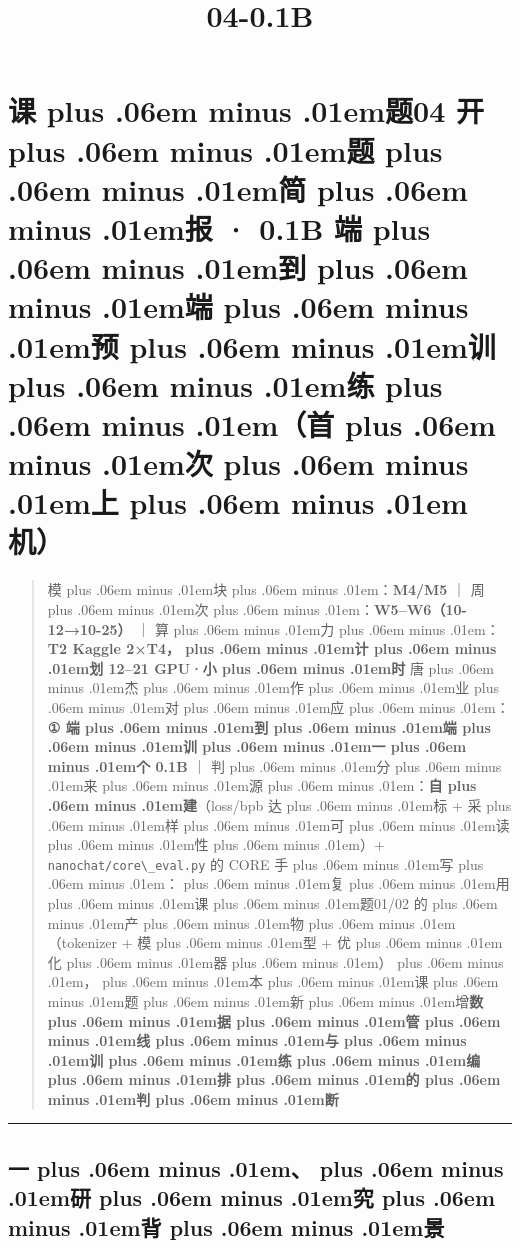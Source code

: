 \documentclass[
]{article}
\title{\zh{课\zhglue 题}04-0.1B\zh{端\zhglue 到\zhglue 端}}
\author{}
\date{}
\newcommand{\passthrough}[1]{#1}
\providecommand{\texorpdfstring}[2]{#1}   %
\def\zh#1{{\zhfont #1}}
\def\sym#1{{\symfont #1}}
\def\zhglue{\hskip0pt plus .06em minus .01em}
\begin{document}
\maketitle

{
\setcounter{tocdepth}{2}
\tableofcontents
}
\section{\texorpdfstring{\zh{课\zhglue 题}04 \zh{开\zhglue 题\zhglue 简\zhglue 报} \sym{·} 0.1B \zh{端\zhglue 到\zhglue 端\zhglue 预\zhglue 训\zhglue 练\zhglue （}\textbf{\zh{首\zhglue 次\zhglue 上\zhglue 机}}\zh{）}}{\zh{课\zhglue 题}04 \zh{开\zhglue 题\zhglue 简\zhglue 报} \sym{·} 0.1B \zh{端\zhglue 到\zhglue 端\zhglue 预\zhglue 训\zhglue 练\zhglue （\zhglue 首\zhglue 次\zhglue 上\zhglue 机\zhglue ）}}}\label{ux8bfeux989804-ux5f00ux9898ux7b80ux62a5-0.1b-ux7aefux5230ux7aefux9884ux8badux7ec3ux9996ux6b21ux4e0aux673a}

\begin{quote}
\zh{模\zhglue 块\zhglue ：}\textbf{M4/M5} \zh{｜} \zh{周\zhglue 次\zhglue ：}\textbf{W5--W6\zh{（}10-12\sym{→}10-25\zh{）}} \zh{｜} \zh{算\zhglue 力\zhglue ：}\textbf{T2 Kaggle 2\sym{×}T4\zh{，\zhglue 计\zhglue 划} 12--21 GPU\sym{·}\zh{小\zhglue 时}} \zh{唐\zhglue 杰\zhglue 作\zhglue 业\zhglue 对\zhglue 应\zhglue ：}\textbf{\sym{①} \zh{端\zhglue 到\zhglue 端\zhglue 训\zhglue 一\zhglue 个} 0.1B} \zh{｜} \zh{判\zhglue 分\zhglue 来\zhglue 源\zhglue ：}\textbf{\zh{自\zhglue 建}}\zh{（}loss/bpb \zh{达\zhglue 标} + \zh{采\zhglue 样\zhglue 可\zhglue 读\zhglue 性\zhglue ）}+ \passthrough{\lstinline!nanochat/core\_eval.py!} \zh{的} CORE \zh{手\zhglue 写\zhglue ：\zhglue 复\zhglue 用\zhglue 课\zhglue 题}01/02 \zh{的\zhglue 产\zhglue 物\zhglue （}tokenizer + \zh{模\zhglue 型} + \zh{优\zhglue 化\zhglue 器\zhglue ）\zhglue ，\zhglue 本\zhglue 课\zhglue 题\zhglue 新\zhglue 增}\textbf{\zh{数\zhglue 据\zhglue 管\zhglue 线\zhglue 与\zhglue 训\zhglue 练\zhglue 编\zhglue 排\zhglue 的\zhglue 判\zhglue 断}}
\end{quote}

\begin{center}\rule{0.5\linewidth}{0.5pt}\end{center}

\subsection{\zh{一\zhglue 、\zhglue 研\zhglue 究\zhglue 背\zhglue 景}}\label{ux4e00ux7814ux7a76ux80ccux666f}
\end{document}
